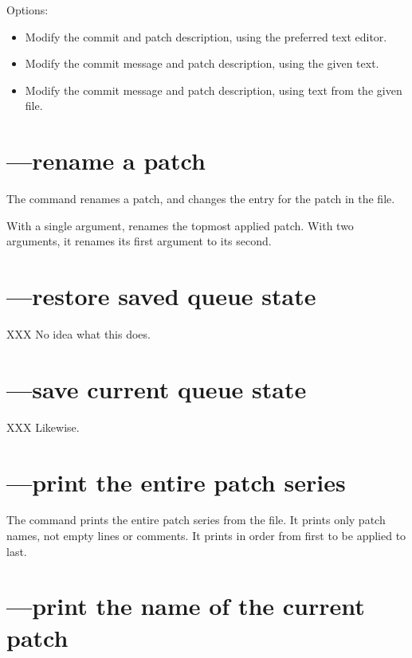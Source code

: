 Options:
\begin{itemize}
\item[\hgxopt{mq}{qrefresh}{-e}] Modify the commit and patch description,
  using the preferred text editor.
\item[\hgxopt{mq}{qrefresh}{-m}] Modify the commit message and patch
  description, using the given text.
\item[\hgxopt{mq}{qrefresh}{-l}] Modify the commit message and patch
  description, using text from the given file.
\end{itemize}

\section{---rename a patch}

The  command renames a patch, and changes the entry for
the patch in the  file.

With a single argument,  renames the topmost applied
patch.  With two arguments, it renames its first argument to its
second.

\section{---restore saved queue state}

XXX No idea what this does.

\section{---save current queue state}

XXX Likewise.

\section{---print the entire patch series}

The  command prints the entire patch series from the
 file.  It prints only patch names, not empty lines
or comments.  It prints in order from first to be applied to last.

\section{---print the name of the current patch}

